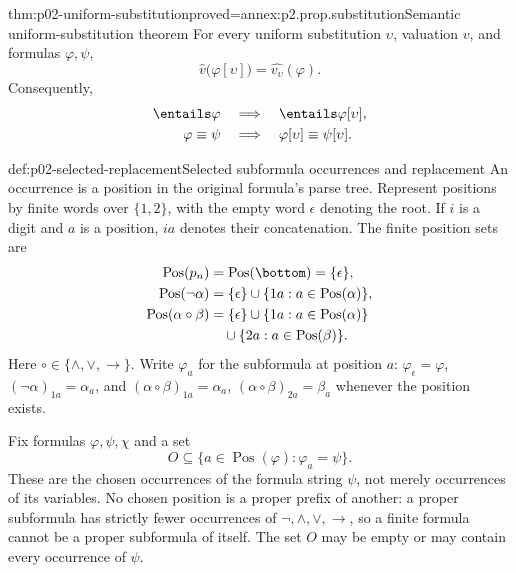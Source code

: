 \begin{hbtheorem}{thm:p02-uniform-substitution}{proved=annex:p2.prop.substitution}{Semantic uniform-substitution theorem}
For every uniform substitution \(\upsilon\), valuation \(v\), and formulas
\(\varphi,\psi\),
\[
 \widehat v\bigl(\varphi[\upsilon]\bigr)
   =\widehat{v_\upsilon}(\varphi).
\]
Consequently,
\[
\begin{aligned}
 \entails\varphi&\quad\Longrightarrow\quad
       \entails\varphi[\upsilon],\\
 \varphi\equiv\psi&\quad\Longrightarrow\quad
       \varphi[\upsilon]\equiv\psi[\upsilon].
\end{aligned}
\]
\end{hbtheorem}

\begin{hbdefinition}{def:p02-selected-replacement}{Selected subformula occurrences and replacement}
An occurrence is a position in the original formula's parse tree.
Represent positions by finite words over \(\{1,2\}\), with the empty word
\(\epsilon\) denoting the root.  If \(i\) is a digit and \(a\) is a position,
\(ia\) denotes their concatenation.  The finite position sets are
\[
\begin{aligned}
 \operatorname{Pos}(p_n)&=\operatorname{Pos}(\bottom)=\{\epsilon\},\\
 \operatorname{Pos}(\neg\alpha)
   &=\{\epsilon\}\cup\{1a:a\in\operatorname{Pos}(\alpha)\},\\
 \operatorname{Pos}(\alpha\circ\beta)
  &=\{\epsilon\}\cup\{1a:a\in\operatorname{Pos}(\alpha)\}\\
  &\quad\cup\{2a:a\in\operatorname{Pos}(\beta)\}.
\end{aligned}
\]
Here \(\circ\in\{\land,\lor,\to\}\).
Write \(\varphi_a\) for the subformula at position \(a\):
\(\varphi_\epsilon=\varphi\),
\((\neg\alpha)_{1a}=\alpha_a\), and
\((\alpha\circ\beta)_{1a}=\alpha_a\),
\((\alpha\circ\beta)_{2a}=\beta_a\) whenever the position exists.

Fix formulas \(\varphi,\psi,\chi\) and a set
\[
 O\subseteq\{a\in\operatorname{Pos}(\varphi):\varphi_a=\psi\}.
\]
These are the chosen occurrences of the formula string \(\psi\), not merely
occurrences of its variables.  No chosen position is a proper prefix of
another: a proper subformula has strictly fewer occurrences of
\(\neg,\land,\lor,\to\), so a finite formula cannot be a proper subformula
of itself.
The set \(O\) may be empty or may contain every occurrence of \(\psi\).


\end{hbdefinition}
